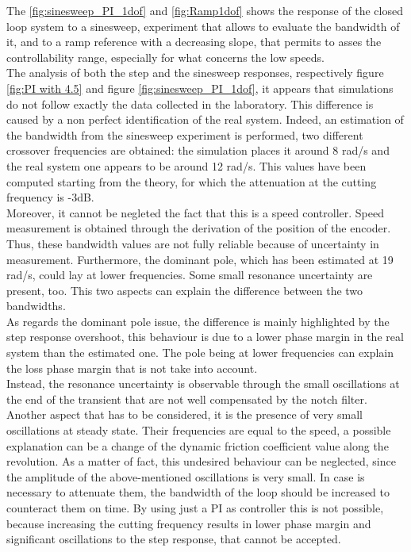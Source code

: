 The \cref{fig:sinesweep_PI_1dof} and \cref{fig:Ramp1dof} shows the response of the closed loop system to a sinesweep, experiment that allows to evaluate the bandwidth of it, and to a ramp reference with a decreasing slope, that permits to asses the controllability range, especially for what concerns the low speeds. \\
The analysis of both the step and the sinesweep responses, respectively figure \ref{fig:PI with 4.5} and figure \ref{fig:sinesweep_PI_1dof}, it appears that simulations do not follow exactly the data collected in the laboratory. This difference is caused by a non perfect identification of the real system. Indeed, an estimation of the bandwidth from the sinesweep experiment is performed, two different crossover frequencies are obtained: the simulation places it around 8 rad/s and the real system one appears to be around 12 rad/s. This values have been computed starting from the theory, for which the attenuation at the cutting frequency is -3dB.\\ 
Moreover, it cannot be negleted the fact that this is a speed controller. Speed measurement is obtained through the derivation of the position of the encoder. Thus, these bandwidth values are not fully reliable because of uncertainty in measurement. 
Furthermore, the dominant pole, which has been estimated at 19 rad/s, could lay at lower frequencies. Some small resonance uncertainty are present, too. This two aspects can explain the difference between the two bandwidths. \\
As regards the dominant pole issue, the difference is mainly highlighted by the step response overshoot, this behaviour is due to a lower phase margin in the real system than the estimated one. The pole being at lower frequencies can explain the loss phase margin that is not take into account. \\
Instead, the resonance uncertainty is observable through the small oscillations at the end of the transient that are not well compensated by the notch filter.\\
Another aspect that has to be considered, it is the presence of very small oscillations at steady state. Their frequencies are equal to the speed, a possible explanation can be a change of the dynamic friction coefficient value along the revolution. As a matter of fact, this undesired behaviour can be neglected, since the amplitude of the above-mentioned oscillations is very small. In case is necessary to attenuate them, the bandwidth of the loop should be increased to counteract them on time. By using just a PI as controller this is not possible, because increasing the cutting frequency results in lower phase margin and significant oscillations to the step response, that cannot be accepted. \\
